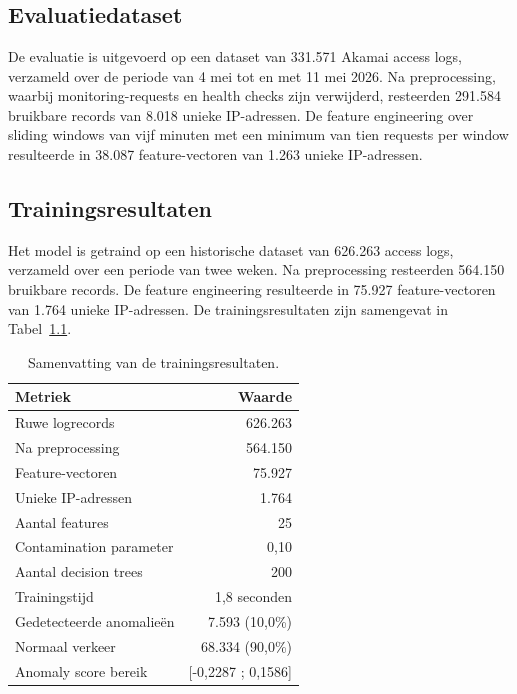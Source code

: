 \chapter{}%
\label{ch:resultaten}
 
\section{Evaluatiedataset}
\label{sec:evaluatiedataset}
 
De evaluatie is uitgevoerd op een dataset van 331.571 Akamai access logs, verzameld over de periode van 4 mei tot en met 11 mei 2026. Na preprocessing, waarbij monitoring-requests en health checks zijn verwijderd, resteerden 291.584 bruikbare records van 8.018 unieke IP-adressen. De feature engineering over sliding windows van vijf minuten met een minimum van tien requests per window resulteerde in 38.087 feature-vectoren van 1.263 unieke IP-adressen.
 
\section{Trainingsresultaten}
\label{sec:trainingsresultaten}
 
Het model is getraind op een historische dataset van 626.263 access logs, verzameld over een periode van twee weken. Na preprocessing resteerden 564.150 bruikbare records. De feature engineering resulteerde in 75.927 feature-vectoren van 1.764 unieke IP-adressen. De trainingsresultaten zijn samengevat in Tabel~\ref{tab:trainingsresultaten}.
 
\begin{table}[h]
\centering
\caption{Samenvatting van de trainingsresultaten.}
\label{tab:trainingsresultaten}
\begin{tabular}{l r}
\hline
\textbf{Metriek} & \textbf{Waarde} \\
\hline
Ruwe logrecords & 626.263 \\
Na preprocessing & 564.150 \\
Feature-vectoren & 75.927 \\
Unieke IP-adressen & 1.764 \\
Aantal features & 25 \\
Contamination parameter & 0,10 \\
Aantal decision trees & 200 \\
Trainingstijd & 1,8 seconden \\
Gedetecteerde anomalieën & 7.593 (10,0\%) \\
Normaal verkeer & 68.334 (90,0\%) \\
Anomaly score bereik & [-0,2287 ; 0,1586] \\
\hline
\end{tabular}
\end{table}



